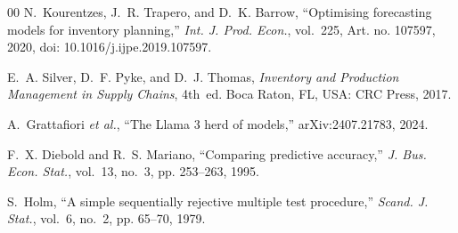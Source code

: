 \documentclass[conference]{IEEEtran}
\begin{document}
\begin{thebibliography}{00}
N.~Kourentzes, J.~R. Trapero, and D.~K. Barrow, ``Optimising forecasting models for inventory
planning,'' \emph{Int. J. Prod. Econ.}, vol.~225, Art. no. 107597, 2020,
doi: 10.1016/j.ijpe.2019.107597.

E.~A. Silver, D.~F. Pyke, and D.~J. Thomas, \emph{Inventory and Production Management in Supply
Chains}, 4th~ed. Boca Raton, FL, USA: CRC Press, 2017.

A.~Grattafiori \emph{et al.}, ``The Llama 3 herd of models,'' arXiv:2407.21783, 2024.

F.~X. Diebold and R.~S. Mariano, ``Comparing predictive accuracy,'' \emph{J. Bus. Econ. Stat.},
vol.~13, no.~3, pp. 253--263, 1995.

S.~Holm, ``A simple sequentially rejective multiple test procedure,'' \emph{Scand. J. Stat.},
vol.~6, no.~2, pp. 65--70, 1979.

\end{thebibliography}
\end{document}
